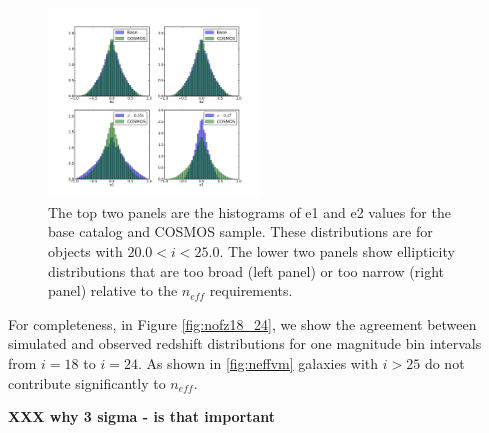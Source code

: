 \documentclass[11pt]{article}
\begin{document}
\begin{figure}[h]
\centering
\includegraphics[width=0.5\textwidth]{validation_figures/e_hist.png}
\caption{The top two panels are the histograms of e1 and e2 values for
  the base catalog and COSMOS sample.  These distributions are for
  objects with $20.0 < i < 25.0$. The lower two panels show
  ellipticity distributions that are too broad (left panel) or too
  narrow (right panel) relative to the $n_{eff}$ requirements.}
\label{fig:e_hist}
\end{figure}

For completeness, in Figure \ref{fig:nofz18_24}, we show the agreement
between simulated and observed \citep{coil04} redshift distributions
for one magnitude bin intervals from $i=18$ to $i=24$.  As shown in
\ref{fig:neffvm} galaxies with $i > 25$ do not contribute significantly to $n_{eff}$.

{\bf XXX why 3 sigma - is that important}
\end{document}
